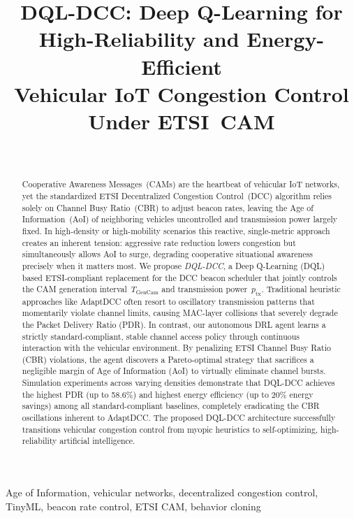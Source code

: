 \documentclass[journal]{IEEEtran}
\title{DQL-DCC: Deep Q-Learning for High-Reliability and Energy-Efficient\\
       Vehicular IoT Congestion Control Under ETSI~CAM}
\author{%
  \IEEEauthorblockN{TBD\textsuperscript{1}, TBD\textsuperscript{2}, TBD\textsuperscript{3}}\\
  \IEEEauthorblockA{\textsuperscript{1,2,3}Department of TBD, Institution TBD, Country TBD\\
  Email: tbd@tbd.edu}
}
\begin{document}

\maketitle

\begin{abstract}
Cooperative Awareness Messages~(CAMs) are the heartbeat of vehicular
IoT networks, yet the standardized ETSI Decentralized Congestion
Control~(DCC) algorithm relies solely on Channel Busy Ratio~(CBR) to
adjust beacon rates, leaving the Age of Information~(AoI) of
neighboring vehicles uncontrolled and transmission power largely
fixed.  In high-density or high-mobility scenarios this reactive,
single-metric approach creates an inherent tension: aggressive rate
reduction lowers congestion but simultaneously allows AoI to surge,
degrading cooperative situational awareness precisely when it matters
most.  We propose \emph{DQL-DCC}, a Deep Q-Learning (DQL) based ETSI-compliant
replacement for the DCC beacon scheduler that jointly controls
the CAM generation interval~$T_{\text{GenCam}}$ and transmission
power~$p_{\text{tx}}$. Traditional heuristic approaches like AdaptDCC
often resort to oscillatory transmission patterns that momentarily violate
channel limits, causing MAC-layer collisions that severely degrade the
Packet Delivery Ratio (PDR). In contrast, our autonomous DRL agent
learns a strictly standard-compliant, stable channel access policy
through continuous interaction with the vehicular environment. By penalizing
ETSI Channel Busy Ratio (CBR) violations, the agent discovers a Pareto-optimal
strategy that sacrifices a negligible margin of Age of Information (AoI)
to virtually eliminate channel bursts. Simulation experiments across varying
densities demonstrate that DQL-DCC achieves the highest PDR (up to 58.6\%)
and highest energy efficiency (up to 20\% energy savings) among all standard-compliant
baselines, completely eradicating the CBR oscillations inherent to AdaptDCC.
The proposed DQL-DCC architecture successfully transitions vehicular congestion
control from myopic heuristics to self-optimizing, high-reliability artificial intelligence.
\end{abstract}

\begin{IEEEkeywords}
Age of Information, vehicular networks, decentralized congestion
control, TinyML, beacon rate control, ETSI CAM, behavior cloning
\end{IEEEkeywords}
\end{document}
